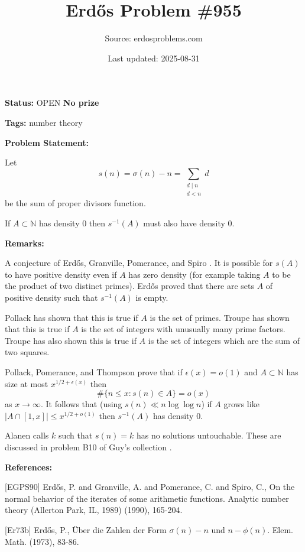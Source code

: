\documentclass{article}
\title{Erd\H{o}s Problem \#955}
\date{Last updated: 2025-08-31}
\author{Source: erdosproblems.com}
\begin{document}
\maketitle

\noindent\textbf{Status:} OPEN \quad \textbf{No prize}

\noindent\textbf{Tags:} number theory

\medskip
\noindent\textbf{Problem Statement:}

Let\[s(n)=\sigma(n)-n=\sum_{\substack{d\mid n\\ d<n}}d\]be the sum of proper divisors function.

If $A\subset \mathbb{N}$ has density $0$ then $s^{-1}(A)$ must also have density $0$.

\bigskip
\noindent\textbf{Remarks:}

A conjecture of Erd\H{o}s, Granville, Pomerance, and Spiro \cite{EGPS90}. It is possible for $s(A)$ to have positive density even if $A$ has zero density (for example taking $A$ to be the product of two distinct primes). Erd\H{o}s \cite{Er73b} proved that there are sets $A$ of positive density such that $s^{-1}(A)$ is empty.

Pollack \cite{Po14b} has shown that this is true if $A$ is the set of primes. Troupe \cite{Tr15} has shown that this is true if $A$ is the set of integers with unusually many prime factors. Troupe \cite{Tr20} has also shown this is true if $A$ is the set of integers which are the sum of two squares.

Pollack, Pomerance, and Thompson \cite{PPT18} prove that if $\epsilon(x)=o(1)$ and $A\subset \mathbb{N}$ has size at most $x^{1/2+\epsilon(x)}$ then\[\#\{ n\leq x: s(n)\in A\} =o(x)\]as $x\to \infty$. It follows that (using $s(n)\ll n\log\log n$) if $A$ grows like $\lvert A\cap [1,x]\rvert\leq x^{1/2+o(1)}$ then $s^{-1}(A)$ has density $0$.

Alanen calls $k$ such that $s(n)=k$ has no solutions untouchable. These are discussed in problem B10 of Guy's collection \cite{Gu04}.

\bigskip
\noindent\textbf{References:}

[EGPS90] Erd\H{o}s, P. and Granville, A. and Pomerance, C. and Spiro, C., On the normal behavior of the iterates of some arithmetic functions. Analytic number theory (Allerton Park, IL, 1989) (1990), 165-204.
 
 [Er73b] Erd\H{o}s, P., \"{U}ber die Zahlen der Form $\sigma (n)-n$ und $n-\phi(n)$. Elem. Math. (1973), 83-86.
 
\end{document}
